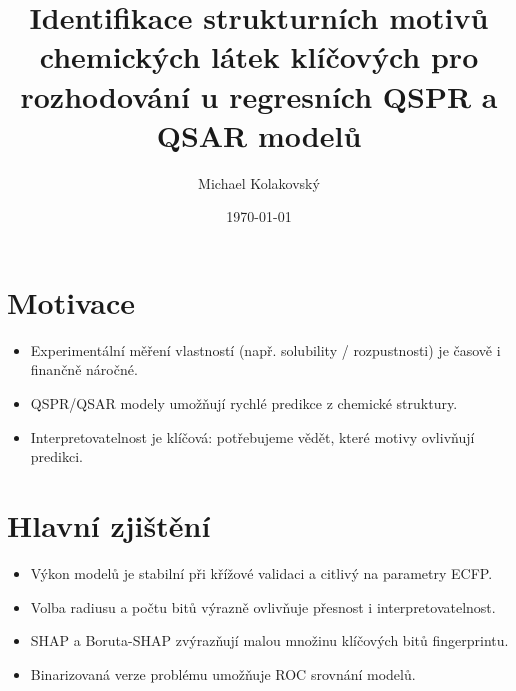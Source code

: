 \documentclass[12pt]{article}
\title{Identifikace strukturních motivů chemických látek klíčových pro rozhodování u regresních QSPR a QSAR modelů}
\author{Michael Kolakovský}
\date{\today}
\begin{document}
\maketitle
\thispagestyle{empty}
\newpage
\section*{Motivace}
\begin{itemize}
  \item Experimentální měření vlastností (např. solubility / rozpustnosti) je časově i finančně náročné.
  \item QSPR/QSAR modely umožňují rychlé predikce z chemické struktury.
  \item Interpretovatelnost je klíčová: potřebujeme vědět, které motivy ovlivňují predikci.
\end{itemize}
\section*{Hlavní zjištění}
\begin{itemize}
  \item Výkon modelů je stabilní při křížové validaci a citlivý na parametry ECFP.
  \item Volba radiusu a počtu bitů výrazně ovlivňuje přesnost i interpretovatelnost.
  \item SHAP a Boruta-SHAP zvýrazňují malou množinu klíčových bitů fingerprintu.
  \item Binarizovaná verze problému umožňuje ROC srovnání modelů.
\end{itemize}
\end{document}

